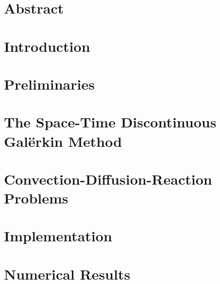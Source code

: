 
\chapter*{Abstract}




\newpage
\tableofcontents
\thispagestyle{plain}



\newpage
\chapter*{Introduction}
 \label{chapter:introduction}





\newpage
\chapter{Preliminaries} \label{chapter:preliminaries}




\newpage
\chapter{The Space-Time Discontinuous Galërkin Method} \label{chapter:dg}




\newpage
\chapter{Convection-Diffusion-Reaction Problems} \label{chapter:cdr}




\newpage
\chapter{Implementation} \label{chapter:implementation}




\newpage
\chapter{Numerical Results} \label{chapter:results}

